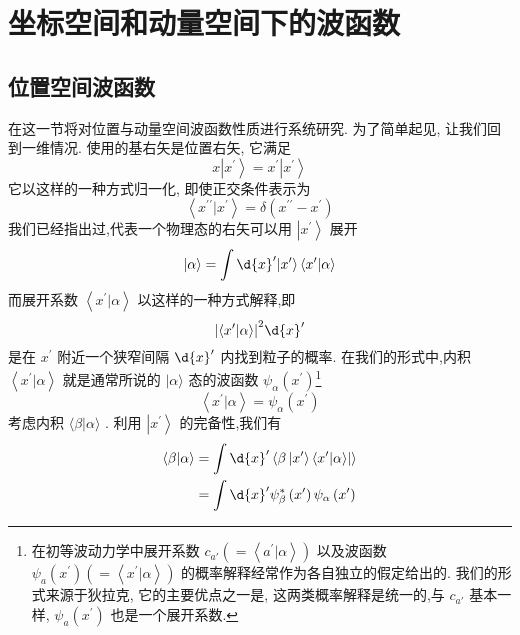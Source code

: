 \documentclass[lang=cn,newtx,10pt,scheme=chinese,thmcnt=section]{elegantbook}
\begin{document}
\section{坐标空间和动量空间下的波函数}
\subsection*{位置空间波函数}
在这一节将对位置与动量空间波函数性质进行系统研究. 为了简单起见, 让我们回到一维情况. 使用的基右矢是位置右矢, 它满足
\begin{equation}
	x\left| {x}^{\prime }\right\rangle = {x}^{\prime }\left| {x}^{\prime }\right\rangle
\end{equation}
它以这样的一种方式归一化, 即使正交条件表示为
\begin{equation}
	\left\langle {{x}^{\prime \prime } | {x}^{\prime }}\right\rangle = \delta \left( {{x}^{\prime \prime } - {x}^{\prime }}\right)
\end{equation}
我们已经指出过,代表一个物理态的右矢可以用 $\left| {x}^{\prime }\right\rangle$ 展开
\begin{equation}
	| {\alpha \rangle = \int \d{x}^{\prime }}| {x}^{\prime }\rangle \left\langle {{x}^{\prime } | \alpha }\right\rangle
\end{equation}
而展开系数 $\left\langle {{x}^{\prime } | \alpha }\right\rangle$ 以这样的一种方式解释,即
\begin{equation}
	{\left| \left\langle {x}^{\prime } | \alpha \right\rangle \right| }^{2}\d{x}^{\prime }
\end{equation}
是在 ${x}^{\prime }$ 附近一个狭窄间隔 $\d{x}^{\prime }$ 内找到粒子的概率. 在我们的形式中,内积 $\left\langle {{x}^{\prime } | \alpha }\right\rangle$ 就是通常所说的 $|\alpha \rangle$ 态的波函数 ${\psi }_{\alpha }\left( {x}^{\prime }\right)$\footnote{在初等波动力学中展开系数 ${c}_{a'}\left( { = \left\langle {{a}^{\prime } | \alpha }\right\rangle }\right)$ 以及波函数 ${\psi }_{a}\left( {x}^{\prime }\right) \left( { = \left\langle {{x}^{\prime } | \alpha }\right\rangle }\right)$ 的概率解释经常作为各自独立的假定给出的. 我们的形式来源于狄拉克, 它的主要优点之一是, 这两类概率解释是统一的,与 ${c}_{a'}$ 基本一样, ${\psi }_{a}\left( {x}^{\prime }\right)$ 也是一个展开系数.}
\begin{equation}
	\left\langle {{x}^{\prime } | \alpha }\right\rangle = {\psi }_{\alpha }\left( {x}^{\prime }\right)
\end{equation}
考虑内积 $\langle \beta | \alpha \rangle$ . 利用 $\left| {x}^{\prime }\right\rangle$ 的完备性,我们有
\begin{equation}
	\begin{aligned}
		\langle \beta | \alpha \rangle &= \int \d{x}^{\prime }\left\langle {\beta \left| {{x}^{\prime }\rangle \left\langle {{x}^{\prime } | \alpha }\right\rangle }\right| }\right\rangle\\
		&= \int \d{x}^{\prime }{\psi }_{\beta }^{ * }\left( {x}^{\prime }\right) {\psi }_{\alpha }\left( {x}^{\prime }\right)
	\end{aligned}
\end{equation}
\end{document}

